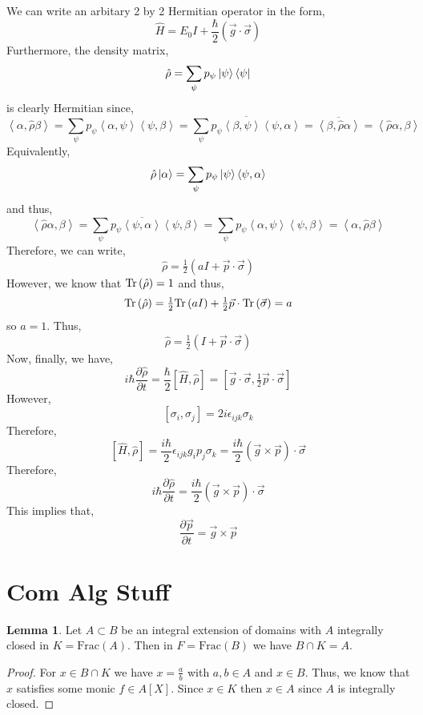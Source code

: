 \documentclass[12pt]{extarticle}
\newcommand{\pderiv}[2]{\frac{\partial{#1}}{\partial{#2}}}
\theoremstyle{definition}
\newtheorem{lemma}[theorem]{Lemma}
\newcommand{\inner}[2]{\left< #1, #2 \right>}
\begin{document}
We can write an arbitary 2 by 2 Hermitian operator in the form,
\[ \hat{H}  = E_0 I + \frac{\hbar}{2} (\vec{g} \cdot \vec{\sigma}) \]
Furthermore, the density matrix,
\[ \hat{\rho} = \sum_{\psi} p_\psi \left| \psi \right> \left< \psi \right| \]
is clearly Hermitian since,
\[ \inner{\alpha}{\hat{\rho} \beta} = \sum_{\psi} p_\psi \inner{\alpha}{\psi} \inner{\psi}{\beta} = \overline{\sum_{\psi} p_\psi \inner{\beta}{\psi} \inner{\psi}{\alpha}} = \overline{\inner{\beta}{\hat{\rho} \alpha}} = \inner{\hat{\rho} \alpha}{\beta} \]
Equivalently,
\[ \hat{\rho} \ket{\alpha} = \sum_\psi p_\psi \ket{\psi} \inner{\psi}{\alpha} \]
and thus,
\[ \inner{\hat{\rho} \alpha}{\beta} = \sum_{\psi} p_\psi \overline{\inner{\psi}{\alpha}} \inner{\psi}{\beta} = \sum_{\psi} p_\psi \inner{\alpha}{\psi} \inner{\psi}{\beta} = \inner{\alpha}{\hat{\rho} \beta} \]
Therefore, we can write,
\[ \hat{\rho} = \tfrac{1}{2} (a I + \vec{p} \cdot \vec{\sigma} ) \]
However, we know that $\mathrm{Tr}\left( \hat{\rho} \right) = 1$ and thus,
\[ \mathrm{Tr}\left( \hat{\rho} \right) = \tfrac{1}{2} \mathrm{Tr}\left( aI \right) + \tfrac{1}{2} \vec{p} \cdot \mathrm{Tr}\left( \vec{\sigma} \right) = a \]
so $a = 1$. Thus,
\[ \hat{\rho} = \tfrac{1}{2} (I + \vec{p} \cdot \vec{\sigma} ) \]
Now, finally, we have,
\[ i \hbar \pderiv{\hat{\rho}}{t} = \frac{\hbar}{2} [\hat{H}, \hat{\rho}] = [\vec{g} \cdot \vec{\sigma}, \tfrac{1}{2} \vec{p} \cdot \vec{\sigma}] \]
However,
\[ [\sigma_i, \sigma_j] = 2 i \epsilon_{ijk} \sigma_k \]
Therefore,
\[  [\hat{H}, \hat{\rho}] = \frac{i \hbar}{2} \epsilon_{ijk} g_i p_j \sigma_k =  \frac{i \hbar}{2} (\vec{g} \times \vec{p}) \cdot \vec{\sigma} \]
Therefore,
\[ i \hbar \pderiv{\hat{\rho}}{t} =  \frac{i \hbar}{2} (\vec{g} \times \vec{p}) \cdot \vec{\sigma}  \]
This implies that, 
\[ \pderiv{\vec{p}}{t} = \vec{g} \times \vec{p} \]


\section{Com Alg Stuff}

\newcommand{\Frac}[1]{\mathrm{Frac}\left( #1 \right)}

\begin{lemma}
Let $A \subset B$ be an integral extension of domains with $A$ integrally closed in $K = \Frac{A}$. Then in $F = \Frac{B}$ we have $B \cap K = A$. 
\end{lemma}

\begin{proof}
For $x \in B \cap K$ we have $x = \frac{a}{b}$ with $a, b \in A$ and $x \in B$. Thus, we know that $x$ satisfies some monic $f \in A[X]$. Since $x \in K$ then $x \in A$ since $A$ is integrally closed. 
\end{proof}
\end{document}
